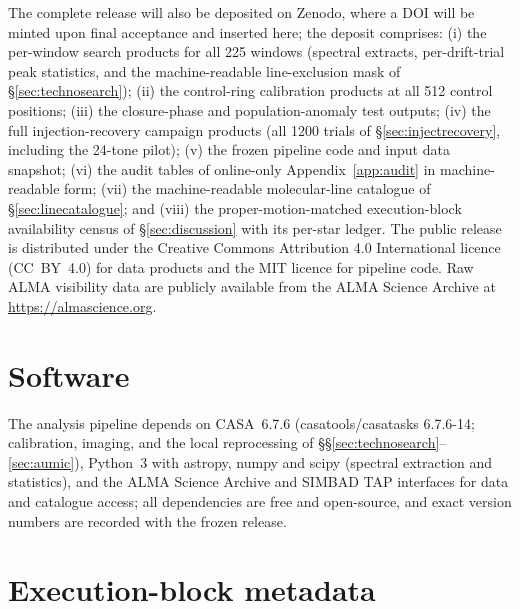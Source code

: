 \documentclass{openjournal}
\begin{document}
The complete release will also be deposited on Zenodo, where a
DOI will be minted upon final acceptance and inserted here; the deposit
comprises: (i) the per-window search products for all 225 windows
(spectral extracts, per-drift-trial peak statistics, and the
machine-readable line-exclusion mask of \S\ref{sec:technosearch}); (ii) the
control-ring calibration products at all 512 control positions;
(iii) the closure-phase and population-anomaly test outputs; (iv) the
full injection-recovery campaign products (all 1200 trials of
\S\ref{sec:injectrecovery}, including the 24-tone pilot); (v) the
frozen pipeline code and
input data snapshot; (vi) the audit tables of online-only Appendix~\ref{app:audit}
in machine-readable form; (vii) the machine-readable molecular-line
catalogue of \S\ref{sec:linecatalogue}; and (viii) the
proper-motion-matched execution-block availability census of
\S\ref{sec:discussion} with its per-star ledger. The public release is
distributed under the Creative Commons Attribution 4.0 International
licence (CC~BY~4.0) for data products and the MIT licence for pipeline
code. Raw ALMA visibility data are
publicly available from the ALMA Science Archive at
\url{https://almascience.org}.

\section*{Software}
The analysis pipeline depends on CASA~6.7.6 (casatools/casatasks
6.7.6-14; calibration, imaging, and the local reprocessing of
\S\S\ref{sec:technosearch}--\ref{sec:aumic}), Python~3 with astropy,
numpy and scipy (spectral extraction and statistics), and the ALMA
Science Archive and SIMBAD TAP interfaces for data and catalogue
access; all dependencies are free and open-source, and exact version
numbers are recorded with the frozen release.


\appendix
\section{Execution-block metadata}
\label{app:ebs}
\end{document}
